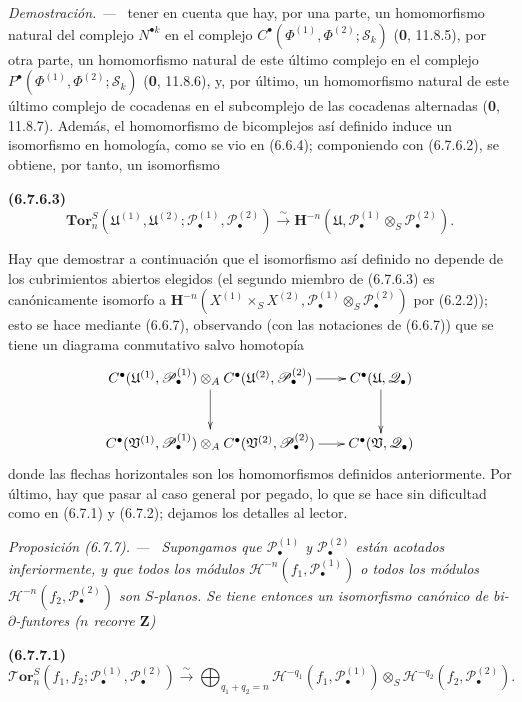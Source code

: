 \documentclass[10pt,oneside]{book}
\newenvironment{env}[1][]{\par\medskip\noindent\textbf{(#1)}\ }{\par}
\newenvironment{proposition}[1][]{\par\medskip\noindent\itshape Proposición (#1). ---\ }{\par}
\newenvironment{proof}{\par\medskip\noindent\textit{Demostración. ---\ }}{\par}
\begin{document}
\begin{proof}
tener en cuenta que hay, por una parte, un homomorfismo natural del complejo
$N^{\bullet k}$ en el complejo
$C^\bullet(\Phi^{(1)},\Phi^{(2)};\mathscr S_k)$
(\textbf{0}, 11.8.5), por otra parte, un homomorfismo natural de este
último complejo en el complejo
$P^\bullet(\Phi^{(1)},\Phi^{(2)};\mathscr S_k)$
(\textbf{0}, 11.8.6), y, por último, un homomorfismo natural de este
último complejo de cocadenas en el subcomplejo de las cocadenas alternadas
(\textbf{0}, 11.8.7). Además, el homomorfismo de bicomplejos así definido
induce un isomorfismo en homología, como se vio en (6.6.4); componiendo con
(6.7.6.2), se obtiene, por tanto, un isomorfismo
\begin{env}[6.7.6.3]
\label{III.6.7.6.3}
\[
  \mathbf{Tor}_n^S
  (\mathfrak U^{(1)},\mathfrak U^{(2)};
   \mathscr P_\bullet^{(1)},\mathscr P_\bullet^{(2)})
  \xrightarrow{\sim}
  \mathbf H^{-n}
  (\mathfrak U,\mathscr P_\bullet^{(1)}\otimes_S\mathscr P_\bullet^{(2)}).
  \tag{6.7.6.3}\label{III.6.7.6.3.eq}
\]
\end{env}
Hay que demostrar a continuación que el isomorfismo así definido no depende
de los cubrimientos abiertos elegidos (el segundo miembro de (6.7.6.3) es
canónicamente isomorfo a
$\mathbf H^{-n}
(X^{(1)}\times_S X^{(2)},
 \mathscr P_\bullet^{(1)}\otimes_S\mathscr P_\bullet^{(2)})$ por (6.2.2));
esto se hace mediante (6.6.7), observando (con las notaciones de (6.6.7)) que
se tiene un diagrama conmutativo salvo homotopía
\[
\xymatrix@C=18pt@R=28pt{
  C^\bullet(\mathfrak U^{(1)},\mathscr P_\bullet^{(1)})
  \otimes_A
  C^\bullet(\mathfrak U^{(2)},\mathscr P_\bullet^{(2)})
  \ar[r]\ar[d]
  & C^\bullet(\mathfrak U,\mathscr Q_\bullet)\ar[d]
  \\
  C^\bullet(\mathfrak V^{(1)},\mathscr P_\bullet^{(1)})
  \otimes_A
  C^\bullet(\mathfrak V^{(2)},\mathscr P_\bullet^{(2)})
  \ar[r]
  & C^\bullet(\mathfrak V,\mathscr Q_\bullet)
}
\]
donde las flechas horizontales son los homomorfismos definidos anteriormente.
Por último, hay que pasar al caso general por pegado, lo que se hace sin
dificultad como en (6.7.1) y (6.7.2); dejamos los detalles al lector.
\end{proof}

\begin{proposition}[6.7.7]
\label{III.6.7.7}
Supongamos que $\mathscr P_\bullet^{(1)}$ y
$\mathscr P_\bullet^{(2)}$ están acotados inferiormente, y que todos los
módulos $\mathcal H^{-n}(f_1,\mathscr P_\bullet^{(1)})$ \textup{o} todos los módulos
$\mathcal H^{-n}(f_2,\mathscr P_\bullet^{(2)})$ son $S$-planos. Se tiene
entonces un isomorfismo canónico de bi-$\partial$-funtores ($n$ recorre
$\mathbf Z$)
\begin{env}[6.7.7.1]
\label{III.6.7.7.1}
\[
  \boldsymbol{\mathscr T\!or}_n^S
  (f_1,f_2;\mathscr P_\bullet^{(1)},\mathscr P_\bullet^{(2)})
  \xrightarrow{\sim}
  \bigoplus_{q_1+q_2=n}
  \mathcal H^{-q_1}(f_1,\mathscr P_\bullet^{(1)})
  \otimes_S
  \mathcal H^{-q_2}(f_2,\mathscr P_\bullet^{(2)}).
  \tag{6.7.7.1}\label{III.6.7.7.1.eq}
\]
\end{env}
\end{proposition}
\end{document}
